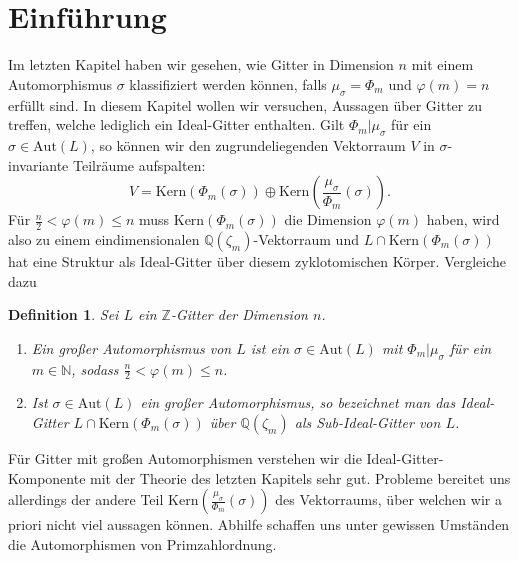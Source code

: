 \documentclass[12pt,a4paper,halfparskip,headsepline,bibtotocnumbered]{scrreprt}
\theoremstyle{nummermitklammern}
\newtheorem{definition}[defsatzusw]{Definition}
\theoremstyle{nonumberbreak}
\newcommand{\N}{\mathbb{N}}
\newcommand{\Z}{\mathbb{Z}}
\newcommand{\Q}{\mathbb{Q}}
\begin{document}
\section{Einführung}
Im letzten Kapitel haben wir gesehen, wie Gitter in Dimension $n$ mit einem Automorphismus $\sigma$ klassifiziert werden können, falls $\mu_\sigma = \Phi_m$ und $\varphi(m) = n$ erfüllt sind. In diesem Kapitel wollen wir versuchen, Aussagen über Gitter zu treffen, welche lediglich ein Ideal-Gitter enthalten. Gilt $\Phi_m \vert \mu_\sigma$ für ein $\sigma \in \text{Aut}(L)$, so können wir den zugrundeliegenden Vektorraum $V$ in $\sigma$-invariante Teilräume aufspalten:
\begin{equation*}
	V = \text{Kern}(\Phi_m(\sigma)) \oplus \text{Kern}\left(\frac{\mu_\sigma}{\Phi_m}(\sigma)\right).
\end{equation*}
Für $\frac{n}{2} < \varphi(m) \leq n$ muss $\text{Kern}(\Phi_m(\sigma))$ die Dimension $\varphi(m)$ haben, wird also zu einem eindimensionalen $\Q(\zeta_m)$-Vektorraum und $L \cap \text{Kern}(\Phi_m(\sigma))$ hat eine Struktur als Ideal-Gitter über diesem zyklotomischen Körper. Vergleiche dazu \cite[Abs. (5.3)]{nebe}

\begin{framed}
	\begin{definition}
		Sei $L$ ein $\Z$-Gitter der Dimension $n$.
		\begin{enumerate}[label=(\roman*)]
			\item Ein \textit{großer Automorphismus} von $L$ ist ein $\sigma \in \text{Aut}(L)$ mit $\Phi_m \vert \mu_\sigma$ für ein $m \in \N$, sodass $\frac{n}{2} < \varphi(m) \leq n$.
			\item Ist $\sigma \in \text{Aut}(L)$ ein großer Automorphismus, so bezeichnet man das Ideal-Gitter $L \cap  \text{Kern}(\Phi_m(\sigma))$ über $\Q(\zeta_m)$ als \textit{Sub-Ideal-Gitter} von $L$.
		\end{enumerate}
	\end{definition}
\end{framed}

Für Gitter mit großen Automorphismen verstehen wir die Ideal-Gitter-Komponente mit der Theorie des letzten Kapitels sehr gut. Probleme bereitet uns allerdings der andere Teil $\text{Kern}\left(\frac{\mu_\sigma}{\Phi_m}(\sigma)\right)$ des Vektorraums, über welchen wir a priori nicht viel aussagen können. Abhilfe schaffen uns unter gewissen Umständen die Automorphismen von Primzahlordnung.
\end{document}
